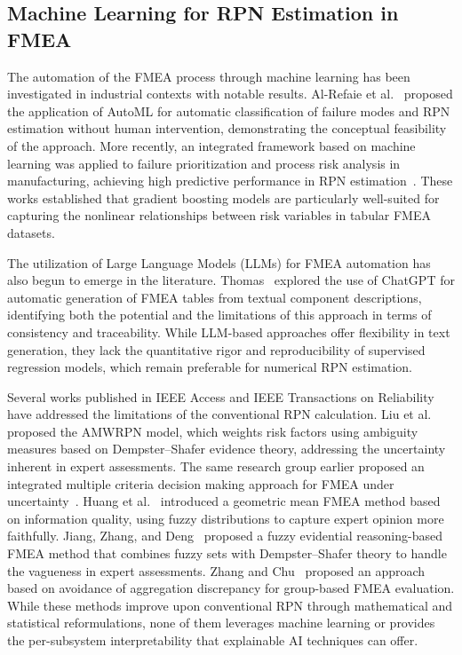 \subsection{Machine Learning for RPN Estimation in FMEA}
\label{subsec:ml_rpn}

The automation of the FMEA process through machine learning has been investigated in industrial contexts with notable results. Al-Refaie et al.~\cite{alrefaie2020enhancing} proposed the application of AutoML for automatic classification of failure modes and RPN estimation without human intervention, demonstrating the conceptual feasibility of the approach. More recently, an integrated framework based on machine learning was applied to failure prioritization and process risk analysis in manufacturing, achieving high predictive performance in RPN estimation~\cite{ref4_ml_fmea2026}. These works established that gradient boosting models are particularly well-suited for capturing the nonlinear relationships between risk variables in tabular FMEA datasets.

The utilization of Large Language Models (LLMs) for FMEA automation has also begun to emerge in the literature. Thomas~\cite{thomas2023revolutionizing} explored the use of ChatGPT for automatic generation of FMEA tables from textual component descriptions, identifying both the potential and the limitations of this approach in terms of consistency and traceability. While LLM-based approaches offer flexibility in text generation, they lack the quantitative rigor and reproducibility of supervised regression models, which remain preferable for numerical RPN estimation.

Several works published in IEEE Access and IEEE Transactions on Reliability have addressed the limitations of the conventional RPN calculation. Liu et al.~\cite{amwrpn2018} proposed the AMWRPN model, which weights risk factors using ambiguity measures based on Dempster--Shafer evidence theory, addressing the uncertainty inherent in expert assessments. The same research group earlier proposed an integrated multiple criteria decision making approach for FMEA under uncertainty~\cite{liu2016fmea_uncertainty}. Huang et al.~\cite{geomean_fmea2019} introduced a geometric mean FMEA method based on information quality, using fuzzy distributions to capture expert opinion more faithfully. Jiang, Zhang, and Deng~\cite{jiang2019fuzzy_fmea} proposed a fuzzy evidential reasoning-based FMEA method that combines fuzzy sets with Dempster--Shafer theory to handle the vagueness in expert assessments. Zhang and Chu~\cite{aadfmea2023} proposed an approach based on avoidance of aggregation discrepancy for group-based FMEA evaluation. While these methods improve upon conventional RPN through mathematical and statistical reformulations, none of them leverages machine learning or provides the per-subsystem interpretability that explainable AI techniques can offer.

